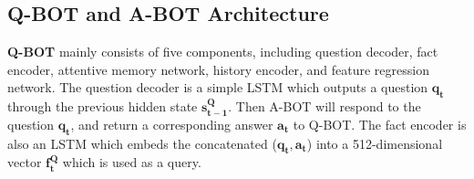 \documentclass[review]{elsarticle}
\begin{document}
	
	
	
	
	\subsection{Q-BOT and A-BOT Architecture}
	\textbf{Q-BOT} mainly consists of five components, including question decoder, fact encoder, attentive memory network, history encoder, and feature regression network. The question decoder is a simple LSTM which outputs a question $\mathbf{q_{t}}$ through the previous hidden state $\mathbf{s^{Q}_{t-1}}$.
	Then A-BOT will respond to the question $\mathbf{q_{t}}$, and return a corresponding answer $\mathbf{a_{t}}$ to Q-BOT. The fact encoder is also an LSTM which embeds the concatenated ($\mathbf{q_{t}},\mathbf{a_{t}}$) into a 512-dimensional vector $\mathbf{f^{Q}_{t}}$ which is used as a query.
	
\end{document}
